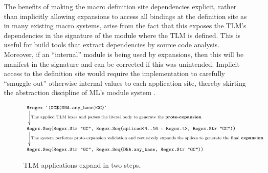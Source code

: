 \documentclass[acmsmall]{acmart}
\newcommand{\li}[1]{\lstinline[basicstyle=\ttfamily\fontsize{9pt}{1em}\selectfont]{#1}}
\begin{document}
The benefits of making the macro definition site dependencies explicit, rather than implicitly allowing expansions to access all bindings at the definition site as in many existing macro systems, arise from the fact that this exposes the TLM's dependencies in the signature of the module where the TLM is defined. This is useful for build tools that extract dependencies by source code analysis. Moreover, if an ``internal'' module is being used by expansions, then this will be manifest in the signature and can be corrected if this was unintended. 
Implicit access to the  definition site would require the implementation to carefully ``smuggle out'' otherwise internal values to each application site, thereby skirting the abstraction discipline of ML's module system \cite{culpepper2005syntactic}.%


\begin{figure}
\vspace{-10px}
\begin{displaymath}
\begin{array}{l}
  \text{\li{$regex `(GC$(DNA.any_base)GC)`}}\\[-10px]
  \xymatrix{
  ~ \ar[d]^{\text{The applied TLM lexes and parses the literal body to generate the \textbf{proto-expansion}.}} \\ ~
  }\\[-5px]
  \text{\li{Regex.Seq(Regex.Str "GC", Regex.Seq(spliced<4..16 : Regex.t>, Regex.Str "GC"))}}\\[-10px]
  \xymatrix{
  ~ \ar[d]^{\text{The system performs proto-expansion validation and recursively expands the splices to generate the final \textbf{expansion}.}} \\ ~
  }\\[-5px]
  \text{\li{Regex.Seq(Regex.Str "GC", Regex.Seq(DNA.any_base, Regex.Str "GC"))}}
\end{array}
\end{displaymath}
\vspace{-4px}
\caption{TLM applications expand in two steps.}
\vspace{-6px}
\label{fig:expansion}
\end{figure}
\end{document}

